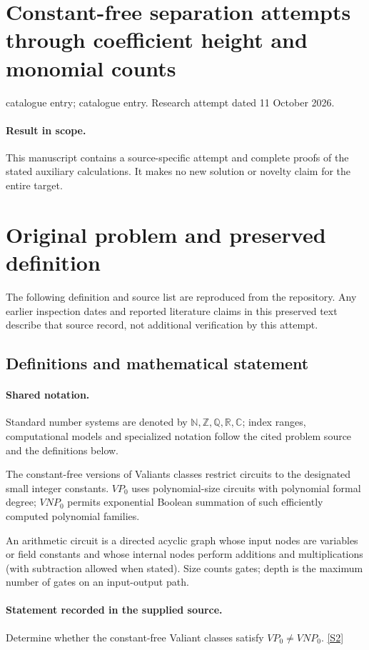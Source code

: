 \documentclass[11pt]{article}
\begin{document}
\section*{Constant-free separation attempts through coefficient height and monomial counts}
\noindent catalogue entry; catalogue entry. Research attempt dated 11 October 2026.
\paragraph{Result in scope.}This manuscript contains a source-specific attempt and complete proofs of the stated auxiliary calculations. It makes no new solution or novelty claim for the entire target.
\section{Original problem and preserved definition}
The following definition and source list are reproduced from the repository. Any earlier inspection dates and reported literature claims in this preserved text describe that source record, not additional verification by this attempt.
\subsection{Definitions and mathematical statement}

\paragraph{Shared notation.}Standard number systems are denoted by $\mathbb N,\mathbb Z,\mathbb Q,\mathbb R,\mathbb C$; index ranges, computational models and specialized notation follow the cited problem source and the definitions below.


The constant-free versions of Valiant\textquotesingle s classes restrict circuits to the designated small integer constants. $VP_0$ uses polynomial-size circuits with polynomial formal degree; $VNP_0$ permits exponential Boolean summation of such efficiently computed polynomial families.

An arithmetic circuit is a directed acyclic graph whose input nodes are variables or field constants and whose internal nodes perform additions and multiplications (with subtraction allowed when stated). Size counts gates; depth is the maximum number of gates on an input-output path.
\paragraph{Statement recorded in the supplied source.}
Determine whether the constant-free Valiant classes satisfy $VP_0\neq VNP_0$. \href{https://doi.org/10.4171/owr/2007/31}{[S2]}
\end{document}
